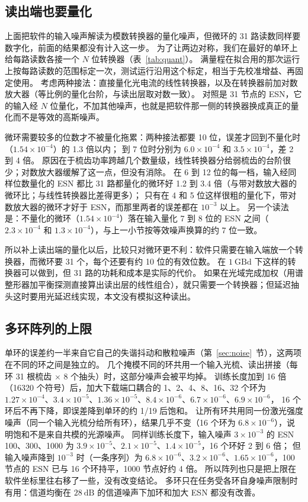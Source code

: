 \subsection{读出端也要量化}\label{sec:quant}

上面把软件的输入噪声解读为模数转换器的量化噪声，但微环的 31 路读数同样要数字化，前面的结果都没有计入这一步。
为了让两边对称，我们在最好的单环上给每路读数各接一个 $N$ 位转换器（表~\ref{tab:quant}）。
满量程在拟合用的那次运行上按每路读数的范围标定一次，测试运行沿用这个标定，相当于先校准增益、再固定使用。
考虑两种接法：直接量化光电流的线性转换器，以及在转换器前加对数放大器（等比例的量化台阶，与读出层取对数一致）。
对照是 31 节点的 ESN，它的输入经 $N$ 位量化，不加其他噪声，也就是把软件那一侧的转换器换成真正的量化而不是等效的高斯噪声。



微环需要较多的位数才不被量化拖累：两种接法都要 10 位，误差才回到不量化时（$1.54\times10^{-4}$）的 1.3 倍以内；
到 7 位时分别为 $6.0\times10^{-4}$ 和 $3.5\times10^{-4}$，差 2 到 4 倍。
原因在于梳齿功率跨越几个数量级，线性转换器分给弱梳齿的台阶很少；对数放大器缓解了这一点，但没有消除。
在 6 到 12 位的每一档，输入经同样位数量化的 ESN 都比 31 路都量化的微环好 1.2 到 3.4 倍（与带对数放大器的微环比；与线性转换器比差得更多）；
只有在 4 和 5 位这样很粗的量化下，带对数放大器的微环才好于 ESN，而那里两者的误差都在 $10^{-3}$ 以上。
另一个读法是：不量化的微环（$1.54\times10^{-4}$）落在输入量化 7 到 8 位的 ESN 之间（$2.3\times10^{-4}$ 和 $1.3\times10^{-4}$），与上一小节按等效噪声换算的约 7 位一致。

所以补上读出端的量化以后，比较只对微环更不利：软件只需要在输入端放一个转换器，而微环要 31 个，每个还要有约 10 位的有效位数。
在 $1~\mathrm{GBd}$ 下这样的转换器可以做到，但 31 路的功耗和成本是实际的代价。
如果在光域完成加权（用谱整形器加平衡探测直接算出读出层的线性组合），就只需要一个转换器；但延迟抽头这时要用光延迟线实现，本文没有模拟这种读出。

\subsection{多环阵列的上限}

单环的误差约一半来自它自己的失谐抖动和散粒噪声（第~\ref{sec:noise}~节），这两项在不同的环之间是独立的。
几个掩模不同的环共用一个输入光梳、读出拼接（每环 31 根梳齿 $\times$ 8 个抽头）时，这部分噪声会被平均掉。
训练长度加到 16 倍（16320 个符号）后，加大下载端口耦合的 1、2、4、8、16、32 个环为
$1.27\times10^{-4}$、$3.4\times10^{-5}$、$1.36\times10^{-5}$、$8.4\times10^{-6}$、$6.7\times10^{-6}$、$6.9\times10^{-6}$，
16 个环后不再下降，即误差降到单环的约 1/19 后饱和。
让所有环共用同一份激光强度噪声（同一个输入光梳分给所有环），结果几乎不变（16 个环为 $6.8\times10^{-6}$），说明饱和不是来自共模的光源噪声。
同样训练长度下，输入噪声 $3\times10^{-3}$ 的 ESN 100、300、1000 为 $3.9\times10^{-5}$、$2.1\times10^{-5}$、$1.4\times10^{-5}$，16 个环好 2 到 6 倍；
但输入噪声降到 $10^{-3}$ 时（一条序列）为 $6.8\times10^{-6}$、$3.2\times10^{-6}$、$1.65\times10^{-6}$，100 节点的 ESN 已与 16 个环持平，1000 节点好约 4 倍。
所以阵列也只是把上限在软件坐标里往右移了一些，没有改变结论。
多环只在任务受各环自身噪声限制时有用：信道均衡在 $28~\mathrm{dB}$ 的信道噪声下加环和加大 ESN 都没有改善。

